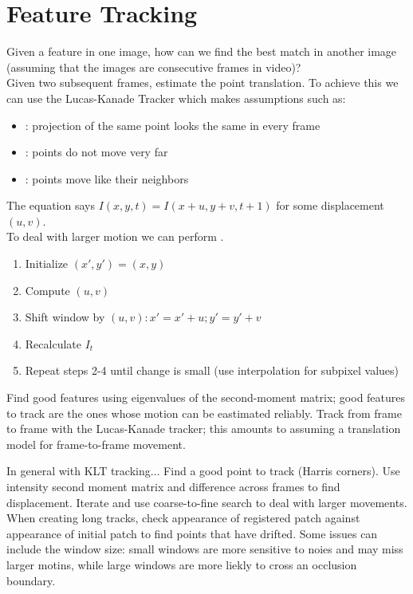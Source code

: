 \documentclass{article}
\begin{document}
\section{Feature Tracking}

Given a feature in one image, how can we find the best match in another image (assuming that the images are consecutive frames in video)? \\ 

Given two subsequent frames, estimate the point translation. To achieve this we can use the Lucas-Kanade Tracker which makes assumptions such as:
\begin{itemize}
  \item {}: projection of the same point looks the same in every frame 
  \item {}: points do not move very far 
  \item {}: points move like their neighbors
\end{itemize}
The  equation says $I(x,y,t) = I(x+u,y+v,t+1)$ for some displacement $(u,v)$. \\ 

To deal with larger motion we can perform . 
\begin{enumerate}
  \item Initialize $(x',y') = (x,y)$ 
  \item Compute $(u,v)$ 
  \item Shift window by $(u,v): x'=x'+u;y'=y'+v$
  \item Recalculate $I_t$ 
  \item Repeat steps 2-4 until change is small (use interpolation for subpixel values)
\end{enumerate}

\begin{definition}
  Find good features using eigenvalues of the second-moment matrix; good features to track are the ones whose motion can be eastimated reliably. Track from frame to frame with the Lucas-Kanade tracker; this amounts to assuming a translation model for frame-to-frame movement. 
\end{definition}

In general with KLT tracking$\dots$ Find a good point to track (Harris corners). Use intensity second moment matrix and difference across frames to find displacement. Iterate and use coarse-to-fine search to deal with larger movements. When creating long tracks, check appearance of registered patch against appearance of initial patch to find points that have drifted. Some issues can include the window size: small windows are more sensitive to noies and may miss larger motins, while large windows are more liekly to cross an occlusion boundary. 
\end{document}
